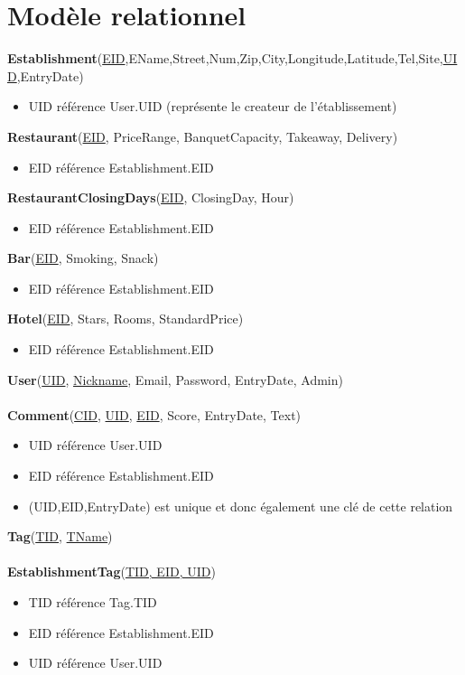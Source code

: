 \documentclass[11pt,a4paper]{report}
\begin{document}
\section*{Modèle relationnel}
\noindent
\textbf{Establishment}(\underline{EID},EName,Street,Num,Zip,City,Longitude,Latitude,Tel,Site,\underline{UID},EntryDate)
\begin{itemize}
\item UID référence User.UID (représente le createur de l'établissement)\\
\end{itemize}
\textbf{Restaurant}(\underline{EID}, PriceRange, BanquetCapacity, Takeaway, Delivery)
\begin{itemize}
\item EID référence Establishment.EID\\
\end{itemize} 
\textbf{RestaurantClosingDays}(\underline{EID}, ClosingDay, Hour)
\begin{itemize}
\item EID référence Establishment.EID\\
\end{itemize}
\textbf{Bar}(\underline{EID}, Smoking, Snack)
\begin{itemize}
\item EID référence Establishment.EID\\
\end{itemize}
\textbf{Hotel}(\underline{EID}, Stars, Rooms, StandardPrice)
\begin{itemize}
\item EID référence Establishment.EID\\
\end{itemize}
\textbf{User}(\underline{UID}, \underline{Nickname}, Email, Password, EntryDate, Admin)\\ \\
\textbf{Comment}(\underline{CID}, \underline{UID}, \underline{EID}, Score, EntryDate, Text)
\begin{itemize}
\item UID référence User.UID
\item EID référence Establishment.EID
\item (UID,EID,EntryDate) est unique et donc également une clé de cette relation\\
\end{itemize}
\textbf{Tag}(\underline{TID}, \underline{TName})\\ \\
\textbf{EstablishmentTag}(\underline{TID, EID, UID})
\begin{itemize}
\item TID référence Tag.TID
\item EID référence Establishment.EID
\item UID référence User.UID\\
\end{itemize}
\end{document}
